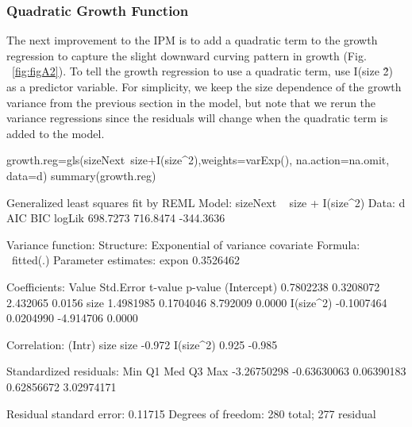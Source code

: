 \documentclass[11pt]{article}
\begin{document}

\subsubsection{Quadratic Growth Function}
\label{subsec:Quadratic Growth}

The next improvement to the IPM is to add a quadratic term to the growth regression to capture the slight downward curving pattern in growth (Fig. ~\ref{fig:figA2}).  To tell the growth regression to use a quadratic term, use I(size \^ 2) as a predictor variable. For simplicity, we keep the size dependence of the growth variance from the previous section in the model, but note that we rerun the variance regressions since the residuals will change when the quadratic term is added to the model.
\begin{Schunk}
\begin{Sinput}
 growth.reg=gls(sizeNext~size+I(size^2),weights=varExp(), na.action=na.omit, data=d)
 summary(growth.reg)
\end{Sinput}
\begin{Soutput}
Generalized least squares fit by REML
  Model: sizeNext ~ size + I(size^2) 
  Data: d 
       AIC      BIC    logLik
  698.7273 716.8474 -344.3636

Variance function:
 Structure: Exponential of variance covariate
 Formula: ~fitted(.) 
 Parameter estimates:
    expon 
0.3526462 

Coefficients:
                 Value Std.Error   t-value p-value
(Intercept)  0.7802238 0.3208072  2.432065  0.0156
size         1.4981985 0.1704046  8.792009  0.0000
I(size^2)   -0.1007464 0.0204990 -4.914706  0.0000

 Correlation: 
          (Intr) size  
size      -0.972       
I(size^2)  0.925 -0.985

Standardized residuals:
        Min          Q1         Med          Q3         Max 
-3.26750298 -0.63630063  0.06390183  0.62856672  3.02974171 

Residual standard error: 0.11715 
Degrees of freedom: 280 total; 277 residual
\end{Soutput}
\end{Schunk}
\end{document}
